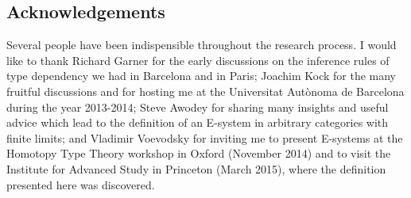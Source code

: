 \subsection*{Acknowledgements}
Several people have been indispensible throughout the research process.
I would like to thank 
Richard Garner for the early discussions on the inference rules of type 
dependency we had in Barcelona and in Paris; 
Joachim Kock for the many fruitful discussions and for hosting me at the Universitat
Aut\`onoma de Barcelona during the year 2013-2014;
Steve Awodey for sharing many insights and useful advice which lead to the
definition of an E-system in arbitrary categories with finite limits;
and Vladimir Voevodsky for inviting me to present E-systems at the Homotopy Type
Theory workshop in Oxford (November 2014) and to visit the Institute for Advanced 
Study in Princeton (March 2015), where the definition presented here was
discovered.
